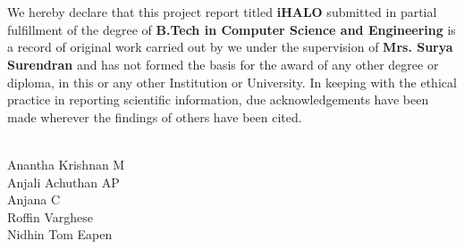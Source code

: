 \section*{ } %
We hereby declare that this project report titled \textbf{iHALO} submitted in partial fulfillment of the degree of \textbf{B.Tech in Computer Science and Engineering}  is a record of original work carried out by we under the supervision of \textbf{Mrs. Surya Surendran} and has not formed the basis for the award of any other degree or diploma, in this or any other Institution or University. In keeping with the ethical practice in reporting scientific information, due acknowledgements have been made wherever the findings of others have been cited.
\\
\\
\begin{flushright}
 Anantha Krishnan M\\
 Anjali Achuthan AP\\
 Anjana C \\       
 Roffin Varghese\\                                                                          
 Nidhin Tom Eapen\\    

\end{flushright}